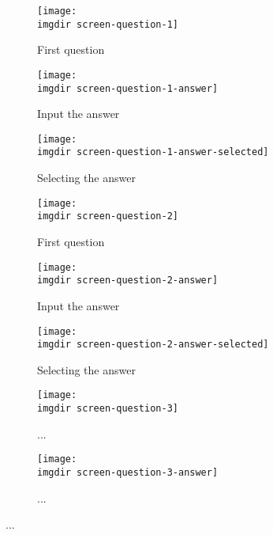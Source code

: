 \begin{figure}[!htbp]
 \centering
 \begin{subfigure}{.3\textwidth}
  \centering
  \texttt{[image: \\imgdir screen-question-1]}
  \caption{First question}
  \label{fig:screen-question-1}
\end{subfigure}
\begin{subfigure}{.3\textwidth}
  \centering
  \texttt{[image: \\imgdir screen-question-1-answer]}
  \caption{Input the answer}
  \label{fig:screen-question-1-answer}
\end{subfigure}
\begin{subfigure}{.3\textwidth}
  \centering
  \texttt{[image: \\imgdir screen-question-1-answer-selected]}
  \caption{Selecting the answer}
  \label{fig:screen-question-1-answer-selected}
\end{subfigure}
\caption{...}
 \caption{}
\end{figure}

\begin{figure}[!htbp]
 \centering
 \begin{subfigure}{.3\textwidth}
  \centering
  \texttt{[image: \\imgdir screen-question-2]}
  \caption{First question}
  \label{fig:sfig1}
\end{subfigure}
\begin{subfigure}{.3\textwidth}
  \centering
  \texttt{[image: \\imgdir screen-question-2-answer]}
  \caption{Input the answer}
  \label{fig:sfig2}
\end{subfigure}
\begin{subfigure}{.3\textwidth}
  \centering
  \texttt{[image: \\imgdir screen-question-2-answer-selected]}
  \caption{Selecting the answer}
  \label{fig:sfig2}
\end{subfigure}
\caption{...}
 \caption{}
\end{figure}

\begin{figure}[!htbp]
 \centering
 \begin{subfigure}{.3\textwidth}
  \centering
  \texttt{[image: \\imgdir screen-question-3]}
  \caption{...}
  \label{fig:sfig1}
\end{subfigure}
\begin{subfigure}{.3\textwidth}
  \centering
  \texttt{[image: \\imgdir screen-question-3-answer]}
  \caption{...}
  \label{fig:sfig2}
\end{subfigure}
 \caption{...}
\end{figure}

